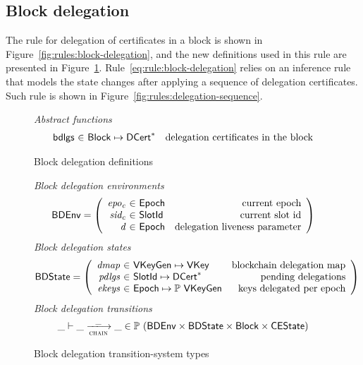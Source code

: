 \subsection{Block delegation}
\label{sec:block-delegation}

The rule for delegation of certificates in a block is shown in
Figure~\ref{fig:rules:block-delegation}, and the new definitions used in this
rule are presented in Figure~\ref{fig:defs:block-delegation}.
Rule~\ref{eq:rule:block-delegation} relies on an inference rule that models the
state changes after applying a sequence of delegation certificates. Such rule
is shown in Figure~\ref{fig:rules:delegation-sequence}.

\begin{figure}
  \emph{Abstract functions}
  \begin{equation*}
    \begin{array}{r@{~\in~}lr}
      \fun{bdlgs} & \Block \mapsto \seqof{\DCert} & \text{delegation certificates in the block}\\
    \end{array}
  \end{equation*}
  \caption{Block delegation definitions}
  \label{fig:defs:block-delegation}
\end{figure}

\begin{figure}
  \emph{Block delegation environments}
  \begin{equation*}
    \BDEnv =
    \left(
      \begin{array}{r@{~\in~}lr}
        \var{epo_c} & \Epoch & \text{current epoch}\\
        \var{sid_c} & \SlotId & \text{current slot id}\\
        \var{d} & \Epoch & \text{delegation liveness parameter}\\
      \end{array}
    \right)
  \end{equation*}
  \emph{Block delegation states}
  \begin{equation*}
    \BDState =
    \left(
      \begin{array}{r@{~\in~}lr}
        \var{dmap} & \VKeyGen \mapsto \VKey & \text{blockchain delegation map}\\
        \var{pdlgs} & \SlotId \mapsto \seqof{\DCert} & \text{pending delegations}\\
        \var{ekeys} & \Epoch \mapsto \powerset{\VKeyGen} & \text{keys delegated per epoch}
      \end{array}
    \right)
  \end{equation*}
  \emph{Block delegation transitions}
  \begin{equation*}
    \_ \vdash \_ \trans{chain}{\_} \_ \in
      \powerset (\BDEnv \times \BDState \times \Block \times \CEState)
  \end{equation*}
  \caption{Block delegation transition-system types}
  \label{fig:ts-types:block-delegation}
\end{figure}

